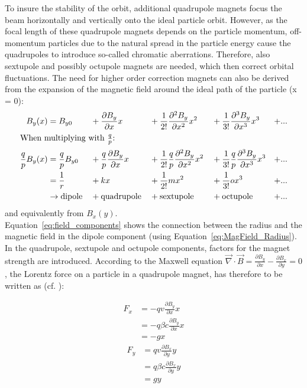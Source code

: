 To insure the stability of the orbit, additional quadrupole magnets focus the beam horizontally and vertically onto the ideal particle orbit.
However, as the focal length of these quadrupole magnets depends on the particle momentum, off-momentum particles due to the natural spread in the particle energy cause the quadrupoles to introduce so-called chromatic aberrations.
Therefore, also sextupole and possibly octupole magnets are needed, which then correct orbital fluctuations.
The need for higher order correction magnets can also be derived from the expansion of the magnetic field around the ideal path of the particle (x = 0):
\begin{alignat}{5}
 B_y(x) &= B_{y0} &&+ \frac{\partial B_y}{\partial x}x &&+ \frac{1}{2!}\frac{\partial^2 B_y}{\partial x^2}x^2 &&+ \frac{1}{3!}\frac{\partial^3 B_y}{\partial x^3}x^3 &+ ...\\
 \intertext{When multiplying with $\frac{q}{p}$:}
 \frac{q}{p}B_y(x) &= \frac{q}{p}B_{y0} &&+ \frac{q}{p}\frac{\partial B_y}{\partial x}x &&+  \frac{1}{2!}\frac{q}{p}\frac{\partial^2 B_y}{\partial x^2}x^2 &&+ \frac{1}{3!}\frac{q}{p}\frac{\partial^3 B_y}{\partial x^3}x^3 &+ ...\\
  &= \frac{1}{r} &&+ kx &&+ \frac{1}{2!}mx^2 &&+ \frac{1}{3!}ox^3 &+ ... \label{eq:field_components}\\
  &\rightarrow \textnormal{dipole} &&+ \textnormal{quadrupole} &&+ \textnormal{sextupole} &&+ \textnormal{octupole} &+ ...\nonumber
\end{alignat}
and equivalently from $B_x(y)$.
\\Equation~\ref{eq:field_components} shows the connection between the radius and the magnetic field in the dipole component (using Equation~\ref{eq:MagField_Radius}).
In the quadrupole, sextupole and octupole components, factors for the magnet strength are introduced.
According to the Maxwell equation $\vec{\nabla}\cdot\vec{B} = \frac{\partial B_y}{\partial x} -\frac{\partial B_x}{\partial y} = 0$, the Lorentz force on a particle in a quadrupole magnet, has therefore to be written as (cf. \cite[p. 372]{VacuumElectronics}):
\begin{multicols}{2}
\noindent 
\begin{align}
 F_x &= -qv\frac{\partial B_y}{\partial x}x \nonumber\\
  &= -q\beta c\frac{\partial B_y}{\partial x}x\\
  &= -gx\label{eq:Quad_Lorentz_x}
\end{align}
\columnbreak
\begin{align}
 F_y &= qv\frac{\partial B_x}{\partial y}y\nonumber \\
  &= q\beta c\frac{\partial B_x}{\partial y}y\\
  &= gy \label{eq:Quad_Lorentz_y}
\end{align}
\end{multicols}
